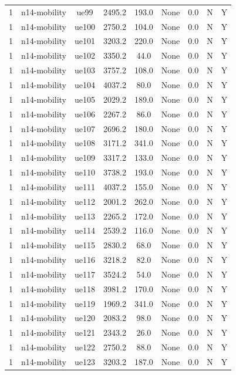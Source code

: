 \begin{table}[ht]
\begin{tabular}{|c|c|c|c|c|c|c|c|c|}
1 & n14-mobility & ue99 & 2495.2 & 193.0 & None & 0.0 & N & Y \\
1 & n14-mobility & ue100 & 2750.2 & 104.0 & None & 0.0 & N & Y \\
1 & n14-mobility & ue101 & 3203.2 & 220.0 & None & 0.0 & N & Y \\
1 & n14-mobility & ue102 & 3350.2 & 44.0 & None & 0.0 & N & Y \\
1 & n14-mobility & ue103 & 3757.2 & 108.0 & None & 0.0 & N & Y \\
1 & n14-mobility & ue104 & 4037.2 & 80.0 & None & 0.0 & N & Y \\
1 & n14-mobility & ue105 & 2029.2 & 189.0 & None & 0.0 & N & Y \\
1 & n14-mobility & ue106 & 2267.2 & 86.0 & None & 0.0 & N & Y \\
1 & n14-mobility & ue107 & 2696.2 & 180.0 & None & 0.0 & N & Y \\
1 & n14-mobility & ue108 & 3171.2 & 341.0 & None & 0.0 & N & Y \\
1 & n14-mobility & ue109 & 3317.2 & 133.0 & None & 0.0 & N & Y \\
1 & n14-mobility & ue110 & 3738.2 & 193.0 & None & 0.0 & N & Y \\
1 & n14-mobility & ue111 & 4037.2 & 155.0 & None & 0.0 & N & Y \\
1 & n14-mobility & ue112 & 2001.2 & 262.0 & None & 0.0 & N & Y \\
1 & n14-mobility & ue113 & 2265.2 & 172.0 & None & 0.0 & N & Y \\
1 & n14-mobility & ue114 & 2539.2 & 116.0 & None & 0.0 & N & Y \\
1 & n14-mobility & ue115 & 2830.2 & 68.0 & None & 0.0 & N & Y \\
1 & n14-mobility & ue116 & 3218.2 & 82.0 & None & 0.0 & N & Y \\
1 & n14-mobility & ue117 & 3524.2 & 54.0 & None & 0.0 & N & Y \\
1 & n14-mobility & ue118 & 3981.2 & 170.0 & None & 0.0 & N & Y \\
1 & n14-mobility & ue119 & 1969.2 & 341.0 & None & 0.0 & N & Y \\
1 & n14-mobility & ue120 & 2083.2 & 98.0 & None & 0.0 & N & Y \\
1 & n14-mobility & ue121 & 2343.2 & 26.0 & None & 0.0 & N & Y \\
1 & n14-mobility & ue122 & 2750.2 & 88.0 & None & 0.0 & N & Y \\
1 & n14-mobility & ue123 & 3203.2 & 187.0 & None & 0.0 & N & Y \\

\end{tabular}
\end{table}
